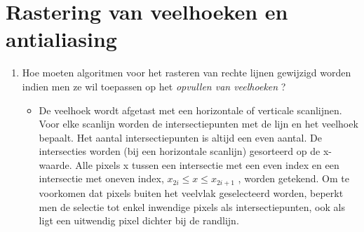 \documentclass{report}
\newcommand{\vraag}[2]{
	\item #1
	
	#2
}
\begin{document}
	\section{Rastering van veelhoeken en antialiasing}
	\begin{enumerate}
		\vraag{
			 Hoe moeten algoritmen voor het rasteren van rechte lijnen gewijzigd worden indien men ze wil toepassen op het \textit{opvullen van veelhoeken} ? \accentuate{(§1.4)}
		}
		{
			\begin{itemize}
				\item De veelhoek wordt afgetast met een horizontale of verticale scanlijnen. Voor elke scanlijn worden de intersectiepunten met de lijn en het veelhoek bepaalt. Het aantal intersectiepunten is altijd een even aantal. De intersecties worden (bij een horizontale scanlijn) gesorteerd op de x-waarde. Alle pixels x tussen een intersectie met een even index en een intersectie met oneven index, $x_{2i} \leq x \leq x_{2i + 1}$ , worden getekend. Om te voorkomen dat pixels buiten het veelvlak geselecteerd worden, beperkt men de selectie tot enkel inwendige pixels als intersectiepunten, ook als ligt een uitwendig pixel dichter bij de randlijn. 
			\end{itemize}
		}
		

\end{enumerate}
\end{document}
